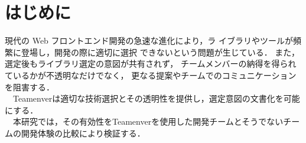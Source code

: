 \documentclass[main]{subfiles}
\begin{document}
\section{はじめに }
現代の Web フロントエンド開発の急速な進化により，ラ
イブラリやツールが頻繁に登場し，開発の際に適切に選択
できないという問題が生じている\cite{npm}\cite{medium.com}．
また，選定後もライブラリ選定の意図が共有されず，
チームメンバーの納得を得られているかが不透明なだけでなく，
更なる提案やチームでのコミュニケーションを阻害する．\\
　Teamenverは適切な技術選択とその透明性を提供し，選定意図の文書化を可能にする．\\
　本研究では，その有効性をTeamenverを使用した開発チームとそうでないチームの開発体験の比較により検証する．
\end{document}
